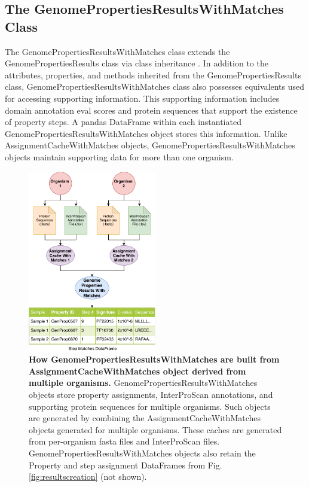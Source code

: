 \pagebreak
\subsection{The GenomePropertiesResultsWithMatches Class} 
\label{PropertyResultsWithMatches}

The GenomePropertiesResultsWithMatches class extends the GenomePropertiesResults 
class via class inheritance \cite{snyder1986encapsulation}. In addition to the 
attributes, properties, and methods inherited from the GenomePropertiesResults 
class, GenomePropertiesResultsWithMatches class also possesses equivalents used 
for accessing supporting information. This supporting information includes 
domain annotation \gls{eval} scores and protein sequences that support the 
existence of property steps. A pandas DataFrame within each instantiated 
GenomePropertiesResultsWithMatches object stores this information. Unlike 
AssignmentCacheWithMatches objects, GenomePropertiesResultsWithMatches objects 
maintain supporting data for more than one organism.

\begin{figure}[!ht]
  \centering
\includegraphics[width=0.50\textwidth]{media/assignment_results_with_matches_overview.pdf}
	 \caption[How GenomePropertiesResultsWithMatches are built from 
AssignmentCacheWithMatches object derived from multiple organisms.]{\textbf{How 
GenomePropertiesResultsWithMatches are built from AssignmentCacheWithMatches 
object derived from multiple organisms.} GenomePropertiesResultsWithMatches 
objects store property assignments, InterProScan annotations, and supporting 
protein sequences for multiple organisms. Such objects are generated by combining the 
AssignmentCacheWithMatches objects generated for multiple organisms. These 
caches are generated from per-organism \gls{fasta} files and InterProScan files. 
GenomePropertiesResultsWithMatches objects also retain the Property and step 
assignment DataFrames from Fig. \ref{fig:resultscreation} (not shown).}
	 \label{fig:resultswithmatchescreation}
\end{figure} 

